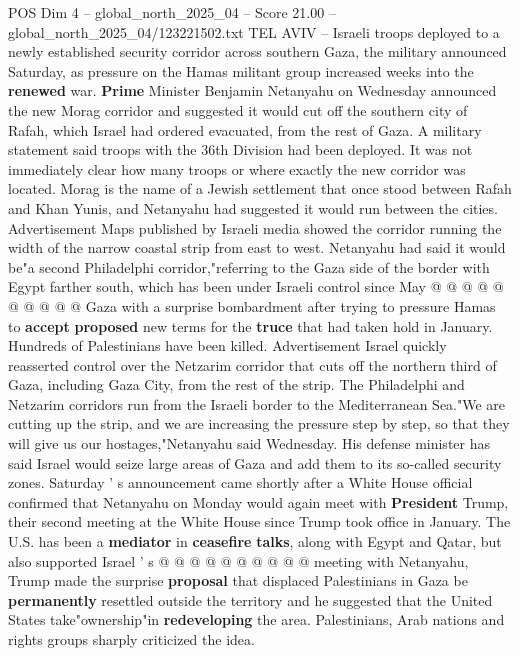\begin{textsample}{POS Dim 4 – global\_north\_2025\_04 – Score 21.00 – global\_north\_2025\_04/123221502.txt}  \label{ex:f4_pos_229}
TEL AVIV -- Israeli troops deployed to a newly established security corridor across southern Gaza, the military announced Saturday, as pressure on the Hamas militant group increased weeks into the \textbf{renewed} war. \textbf{Prime} Minister Benjamin Netanyahu on Wednesday announced the new Morag corridor and suggested it would cut off the southern city of Rafah, which Israel had ordered evacuated, from the rest of Gaza.
A military statement said troops with the 36th Division had been deployed.
It was not immediately clear how many troops or where exactly the new corridor was located.
Morag is the name of a Jewish settlement that once stood between Rafah and Khan Yunis, and Netanyahu had suggested it would run between the cities.
Advertisement Maps published by Israeli media showed the corridor running the width of the narrow coastal strip from east to west.
Netanyahu had said it would be"a second Philadelphi corridor,"referring to the Gaza side of the border with Egypt farther south, which has been under Israeli control since May @ @ @ @ @ @ @ @ @ @ Gaza with a surprise bombardment after trying to pressure Hamas to \textbf{accept} \textbf{proposed} new terms for the \textbf{truce} that had taken hold in January.
Hundreds of Palestinians have been killed.
Advertisement Israel quickly reasserted control over the Netzarim corridor that cuts off the northern third of Gaza, including Gaza City, from the rest of the strip.
The Philadelphi and Netzarim corridors run from the Israeli border to the Mediterranean Sea."We are cutting up the strip, and we are increasing the pressure step by step, so that they will give us our hostages,"Netanyahu said Wednesday.
His defense minister has said Israel would seize large areas of Gaza and add them to its so-called security zones.
Saturday ' s announcement came shortly after a White House official confirmed that Netanyahu on Monday would again meet with \textbf{President} Trump, their second meeting at the White House since Trump took office in January.
The U.S. has been a \textbf{mediator} in \textbf{ceasefire} \textbf{talks}, along with Egypt and Qatar, but also supported Israel ' s @ @ @ @ @ @ @ @ @ @ meeting with Netanyahu, Trump made the surprise \textbf{proposal} that displaced Palestinians in Gaza be \textbf{permanently} resettled outside the territory and he suggested that the United States take"ownership"in \textbf{redeveloping} the area.
Palestinians, Arab nations and rights groups sharply criticized the idea.

\end{textsample}
